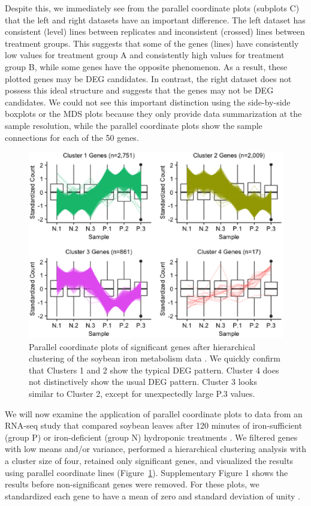 \documentclass{bioinfo}
\begin{document}
Despite this, we immediately see from the parallel coordinate plots (subplots C) that the left and right datasets have an important difference. The left dataset has consistent (level) lines between replicates and inconsistent (crossed) lines between treatment groups. This suggests that some of the genes (lines) have consistently low values for treatment group A and consistently high values for treatment group B, while some genes have the opposite phenomenon. As a result, these plotted genes may be DEG candidates. In contrast, the right dataset does not possess this ideal structure and suggests that the genes may not be DEG candidates. We could not see this important distinction using the side-by-side boxplots or the MDS plots because they only provide data summarization at the sample resolution, while the parallel coordinate plots show the sample connections for each of the 50 genes.

\begin{figure}
\includegraphics[width=\linewidth]{sbIRClustersSig.eps}
\caption{Parallel coordinate plots of significant genes after hierarchical clustering of the soybean iron metabolism data \citep{Lauter16}. We quickly confirm that Clusters 1 and 2 show the typical DEG pattern. Cluster 4 does not distinctively show the usual DEG pattern. Cluster 3 looks similar to Cluster 2, except for unexpectedly large P.3 values.
\label{sbIRClustersSig}}
\end{figure}

We will now examine the application of parallel coordinate plots to data from an RNA-seq study that compared soybean leaves after 120 minutes of iron-sufficient (group P) or iron-deficient (group N) hydroponic treatments \citep{Lauter16}. We filtered genes with low means and/or variance, performed a hierarchical clustering analysis with a cluster size of four, retained only significant genes, and visualized the results using parallel coordinate lines (Figure~\ref{sbIRClustersSig}). Supplementary Figure 1 shows the results before non-significant genes were removed. For these plots, we standardized each gene to have a mean of zero and standard deviation of unity \citep{Chandrasekhar, de Souto}.
\end{document}
